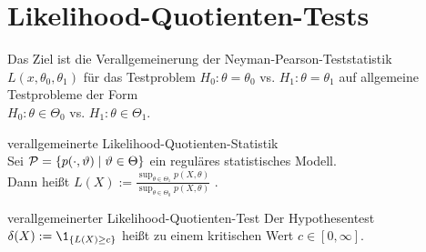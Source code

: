 \section{%
    Likelihood-Quotienten-Tests%
}

\begin{Bem}
    Das Ziel ist die Verallgemeinerung der Neyman-Pearson-Teststatistik $L(x, \theta_0, \theta_1)$
    für das Testproblem $H_0\colon \theta = \theta_0$ vs. $H_1\colon \theta = \theta_1$
    auf allgemeine Testprobleme der Form\\
    $H_0\colon \theta \in \Theta_0$ vs. $H_1\colon \theta \in \Theta_1$.
\end{Bem}

\begin{Def}{verallgemeinerte Likelihood-Quotienten-Statistik}\\
    Sei $\P = \{p(\cdot, \theta) \;|\; \theta \in \Theta\}$ ein reguläres statistisches Modell.\\
    Dann heißt $L(X) := \frac{\sup_{\theta \in \Theta_1} p(X, \theta)}
    {\sup_{\theta \in \Theta_0} p(X, \theta)}$
    .
\end{Def}

\begin{Def}{verallgemeinerter Likelihood-Quotienten-Test}
    Der Hypothesentest $\delta(X) := \1_{\{L(X) \ge c\}}$ heißt
     zu einem kritischen Wert
    $c \in [0, \infty]$.
\end{Def}

